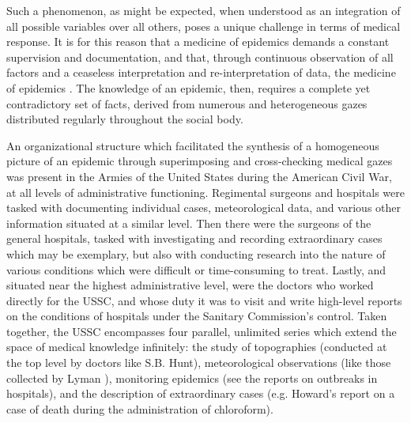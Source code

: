 \documentclass{report}
\begin{document}
  Such a phenomenon, as might be expected, when understood as an integration of all possible variables over all others, poses a unique challenge in terms of medical
  response. It is for this reason that a medicine of epidemics demands a constant supervision and documentation, and that, through continuous observation
  of all factors and a ceaseless interpretation and re-interpretation of data, the medicine of epidemics  \autocite[pp. 25]{Foucault1994}. The knowledge of an epidemic, then, requires a complete
  yet contradictory set of facts, derived from numerous and heterogeneous gazes distributed regularly throughout the social body. 

  An organizational structure which facilitated the synthesis of a homogeneous picture of an epidemic through superimposing and cross-checking 
  medical gazes was present in the Armies of the United States during the American Civil War, at all levels of administrative functioning. Regimental
  surgeons and hospitals were tasked with documenting individual cases, meteorological data, and various other information situated at a similar
  level. Then there were the surgeons of the general hospitals, tasked with investigating and recording extraordinary cases which may be exemplary,
  but also with conducting research into the nature of various conditions which were difficult or time-consuming to treat. Lastly, and situated near
  the highest administrative level, were the doctors who worked directly for the USSC, and whose duty it was to visit and write high-level
  reports on the conditions of hospitals under the Sanitary Commission's control. Taken together, the USSC encompasses four parallel,
  unlimited series which extend the space of medical knowledge infinitely\autocite[pp.25]{Foucault1994}: the study of topographies 
  (conducted at the top level by doctors like S.B. Hunt\autocite{ussc:6:0990}), meteorological observations (like those collected by Lyman 
  \autocite{ussc:6:0112}), monitoring epidemics (see the reports on outbreaks in hospitals\autocite{ussc:9:1198}), and the description of extraordinary 
  cases (e.g. Howard's report on a case of death during the administration of chloroform\autocite{ussc:9:0388}).
\end{document}
